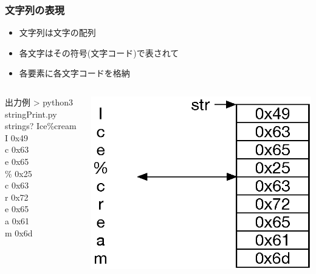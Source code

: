 \begin{frame}[containsverbatim]
\frametitle{文字列の表現}
  \begin{itemize}
\item 文字列は文字の配列
\item 各文字はその符号(文字コード)で表されて
\item 各要素に各文字コードを格納
  \end{itemize}
  \begin{columns}
    \begin{column}{0.4\textwidth}
      \begin{itembox}{出力例}
\scriptsize
> python3 stringPrint.py\\
strings? Ice\%cream\\
I 0x49\\
c 0x63\\
e 0x65\\
\% 0x25\\
c 0x63\\
r 0x72\\
e 0x65\\
a 0x61\\
m 0x6d
      \end{itembox}
    \end{column}
    \begin{column}{0.6\textwidth}
      \begin{center}
\includegraphics[scale=0.5]{./Figure/elementaryCS-figStrings.eps}
      \end{center}
    \end{column}
  \end{columns}
\end{frame}
